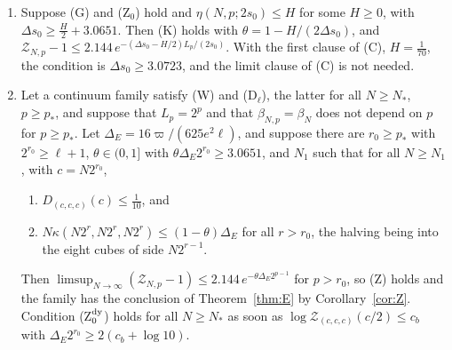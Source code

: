 \begin{corollary}\label{cor:gapbridge}
\begin{enumerate}[label=\textup{(\roman*)},leftmargin=*]
\item Suppose \textup{(G)} and \textup{(Z$_0$)} hold and $\eta(N,p;2s_0)\le
H$ for some $H\ge0$, with $\Delta s_0\ge\frac H2+3.0651$. Then \textup{(K)}
holds with $\theta=1-H/(2\Delta s_0)$, and $\mathcal Z_{N,p}-1\le2.144\,
e^{-(\Delta s_0-H/2)L_p/(2s_0)}$. With the first clause of \textup{(C)},
$H=\frac1{70}$, the condition is $\Delta s_0\ge3.0723$, and the limit clause
of \textup{(C)} is not needed.
\item Let a continuum family satisfy \textup{(W)} and \textup{(D$_\ell$)},
the latter for all $N\ge N_*$, $p\ge p_*$, and suppose that $L_p=2^p$ and
that $\beta_{N,p}=\beta_N$ does not depend on $p$ for $p\ge p_*$. Let
$\Delta_E=16\varpi/(625e^2\ell)$, and suppose there are $r_0\ge p_*$ with
$2^{r_0}\ge\ell+1$, $\theta\in(0,1]$ with $\theta\Delta_E2^{r_0}\ge3.0651$,
and $N_1$ such that for all $N\ge N_1$, with $c=N2^{r_0}$,
\begin{enumerate}[leftmargin=*]
\item[\textup{(Z$_0^{\rm dy}$)}] $D_{(c,c,c)}(c)\le\frac1{10}$, and
\item[\textup{(K$^{\rm dy}$)}] $N\kappa(N2^r,N2^r,N2^r)\le(1-\theta)\Delta_E$
for all $r>r_0$, the halving being into the eight cubes of side $N2^{r-1}$.
\end{enumerate}
Then $\limsup_{N\to\infty}(\mathcal Z_{N,p}-1)\le2.144\,e^{-\theta\Delta_E
2^{p-1}}$ for $p>r_0$, so \textup{(Z)} holds and the family has the
conclusion of Theorem~\ref{thm:E} by Corollary~\ref{cor:Z}. Condition
\textup{(Z$_0^{\rm dy}$)} holds for all $N\ge N_*$ as soon as
$\log\mathcal Z_{(c,c,c)}(c/2)\le c_b$ with $\Delta_E2^{r_0}\ge2(c_b+\log10)$.
\end{enumerate}
\end{corollary}

